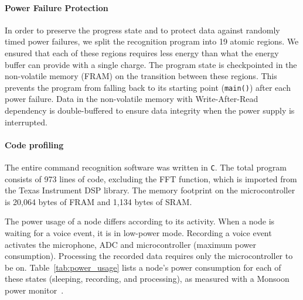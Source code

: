 \paragraph{Power Failure Protection}
In order to preserve the progress state and to protect \cim data against randomly timed power failures, we split the recognition program into 19 atomic regions. We ensured that each of these regions requires less energy than what the energy buffer can provide with a single charge. The program state is checkpointed in the non-volatile memory (FRAM) on the transition between these regions. This prevents the program from falling back to its starting point (\texttt{main()}) after each power failure. Data in the non-volatile memory with Write-After-Read dependency is double-buffered to ensure data integrity when the power supply is interrupted.

\paragraph{Code profiling}
The entire command recognition software was written in {\tt C}. The total program consists of 973 lines of code, excluding the FFT function, which is imported from the Texas Instrument DSP library.
The memory footprint on the microcontroller is 20,064 bytes of FRAM and 1,134 bytes of SRAM.

The power usage of a node differs according to its activity. When a node is waiting for a voice event, it is in low-power mode. Recording a voice event activates the microphone, ADC and microcontroller (maximum power consumption). Processing the recorded data requires only the microcontroller to be on. Table~\ref{tab:power_usage} lists a node's power consumption for each of these states (sleeping, recording, and processing), as measured with a Monsoon power monitor~\cite{monsoon}. 




